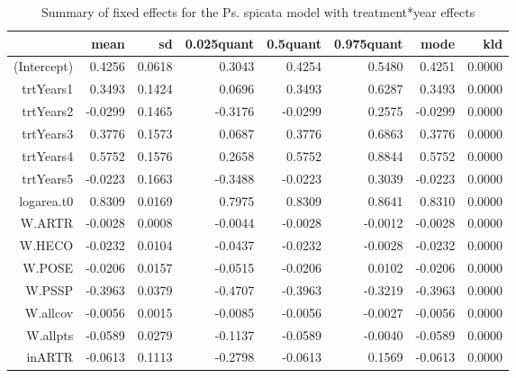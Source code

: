 \begin{table}[ht]
\centering
\caption{Summary of fixed effects for the Ps. spicata model with treatment*year effects} 
\label{PSSPgrowth-trtYears}
\begin{tabular}{rrrrrrrr}
  \hline
 & mean & sd & 0.025quant & 0.5quant & 0.975quant & mode & kld \\ 
  \hline
(Intercept) & 0.4256 & 0.0618 & 0.3043 & 0.4254 & 0.5480 & 0.4251 & 0.0000 \\ 
  trtYears1 & 0.3493 & 0.1424 & 0.0696 & 0.3493 & 0.6287 & 0.3493 & 0.0000 \\ 
  trtYears2 & -0.0299 & 0.1465 & -0.3176 & -0.0299 & 0.2575 & -0.0299 & 0.0000 \\ 
  trtYears3 & 0.3776 & 0.1573 & 0.0687 & 0.3776 & 0.6863 & 0.3776 & 0.0000 \\ 
  trtYears4 & 0.5752 & 0.1576 & 0.2658 & 0.5752 & 0.8844 & 0.5752 & 0.0000 \\ 
  trtYears5 & -0.0223 & 0.1663 & -0.3488 & -0.0223 & 0.3039 & -0.0223 & 0.0000 \\ 
  logarea.t0 & 0.8309 & 0.0169 & 0.7975 & 0.8309 & 0.8641 & 0.8310 & 0.0000 \\ 
  W.ARTR & -0.0028 & 0.0008 & -0.0044 & -0.0028 & -0.0012 & -0.0028 & 0.0000 \\ 
  W.HECO & -0.0232 & 0.0104 & -0.0437 & -0.0232 & -0.0028 & -0.0232 & 0.0000 \\ 
  W.POSE & -0.0206 & 0.0157 & -0.0515 & -0.0206 & 0.0102 & -0.0206 & 0.0000 \\ 
  W.PSSP & -0.3963 & 0.0379 & -0.4707 & -0.3963 & -0.3219 & -0.3963 & 0.0000 \\ 
  W.allcov & -0.0056 & 0.0015 & -0.0085 & -0.0056 & -0.0027 & -0.0056 & 0.0000 \\ 
  W.allpts & -0.0589 & 0.0279 & -0.1137 & -0.0589 & -0.0040 & -0.0589 & 0.0000 \\ 
  inARTR & -0.0613 & 0.1113 & -0.2798 & -0.0613 & 0.1569 & -0.0613 & 0.0000 \\ 
   \hline
\end{tabular}
\end{table}

